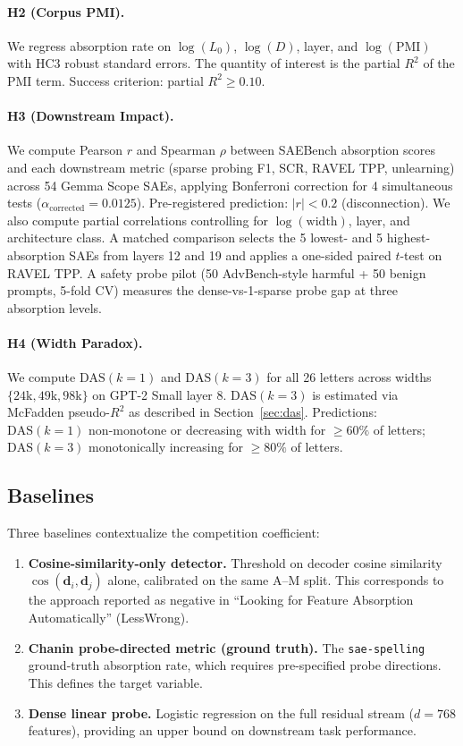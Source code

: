 \documentclass{article}
\begin{document}
\paragraph{H2 (Corpus PMI).} We regress absorption rate on $\log(L_0)$, $\log(D)$, layer, and $\log(\text{PMI})$ with HC3 robust standard errors. The quantity of interest is the partial $R^2$ of the PMI term. Success criterion: partial $R^2 \geq 0.10$.

\paragraph{H3 (Downstream Impact).} We compute Pearson $r$ and Spearman $\rho$ between SAEBench absorption scores and each downstream metric (sparse probing F1, SCR, RAVEL TPP, unlearning) across 54 Gemma Scope SAEs, applying Bonferroni correction for 4 simultaneous tests ($\alpha_{\text{corrected}} = 0.0125$). Pre-registered prediction: $|r| < 0.2$ (disconnection). We also compute partial correlations controlling for $\log(\text{width})$, layer, and architecture class. A matched comparison selects the 5 lowest- and 5 highest-absorption SAEs from layers 12 and 19 and applies a one-sided paired $t$-test on RAVEL TPP. A safety probe pilot (50 AdvBench-style harmful + 50 benign prompts, 5-fold CV) measures the dense-vs-1-sparse probe gap at three absorption levels.

\paragraph{H4 (Width Paradox).} We compute $\text{DAS}(k{=}1)$ and $\text{DAS}(k{=}3)$ for all 26 letters across widths $\{24\text{k}, 49\text{k}, 98\text{k}\}$ on GPT-2 Small layer 8. $\text{DAS}(k{=}3)$ is estimated via McFadden pseudo-$R^2$ as described in Section~\ref{sec:das}. Predictions: $\text{DAS}(k{=}1)$ non-monotone or decreasing with width for $\geq 60\%$ of letters; $\text{DAS}(k{=}3)$ monotonically increasing for $\geq 80\%$ of letters.

\subsection{Baselines}

Three baselines contextualize the competition coefficient:
\begin{enumerate}
  \item \textbf{Cosine-similarity-only detector.} Threshold on decoder cosine similarity $\cos(\mathbf{d}_i, \mathbf{d}_j)$ alone, calibrated on the same A--M split. This corresponds to the approach reported as negative in ``Looking for Feature Absorption Automatically'' (LessWrong).
  \item \textbf{Chanin probe-directed metric (ground truth).} The \texttt{sae-spelling} ground-truth absorption rate, which requires pre-specified probe directions. This defines the target variable.
  \item \textbf{Dense linear probe.} Logistic regression on the full residual stream ($d = 768$ features), providing an upper bound on downstream task performance.
\end{enumerate}
\end{document}
